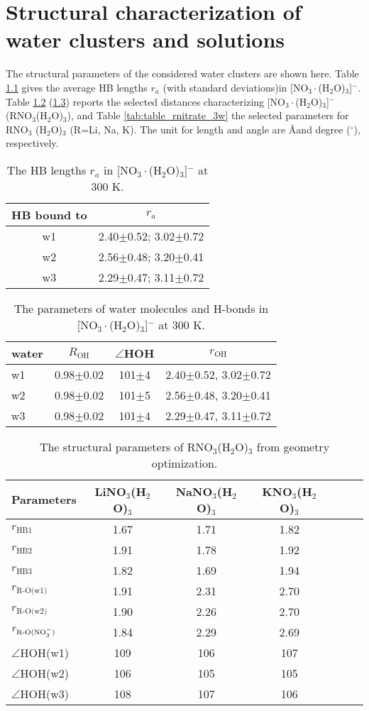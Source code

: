 \chapter{Structural characterization of water clusters and solutions}\label{structure_of_clusters}
The structural parameters of the considered water clusters are shown here.
Table \ref{tab:3_nitrate_bond} gives the average HB lengths $r_a$ (with standard deviations)in [NO$_3\cdot$(H$_2$O)$_3$]$^-$.  
Table \ref{tab:3w_nitrate} (\ref{tab:table_geo_opt}) reports the selected distances characterizing 
[NO$_3\cdot$(H$_2$O)$_3$]$^-$ (RNO$_3$(H$_2$O)$_3$), and Table \ref{tab:table_rnitrate_3w} the selected parameters for RNO$_3$   
 (H$_2$O)$_3$ (R=Li, Na, K).
The unit for length and angle are \AA and degree ($^\circ$), respectively.
% 
\begin{table}[!h]
\centering
\caption{\label{tab:3_nitrate_bond}%
The HB lengths $r_a$ in [NO$_3\cdot$(H$_2$O)$_3$]$^-$ at 300 K.} 
\begin{tabular}{cc} \\\toprule
 HB bound to & \multicolumn{1}{c}{ $r_a$} \\
\hline
 w1 &2.40$\pm$0.52; 3.02$\pm$0.72 \\
 w2 &2.56$\pm$0.48; 3.20$\pm$0.41 \\
 w3 &2.29$\pm$0.47; 3.11$\pm$0.72
\end{tabular}
\end{table}
%
\begin{table}[!htbp]
\centering
\caption{\label{tab:3w_nitrate}%
The parameters of water molecules and H-bonds in [NO$_3\cdot$(H$_2$O)$_3$]$^-$ at 300 K.}
\begin{tabular}{lccc}
water &$R_\text{OH}$ &$\angle$HOH & $r_\text{OH}$ \\
\hline
w1 &0.98$\pm$0.02 &101$\pm$4 & 2.40$\pm$0.52, 3.02$\pm$0.72 \\
w2 &0.98$\pm$0.02 &101$\pm$5 & 2.56$\pm$0.48, 3.20$\pm$0.41 \\
w3 &0.98$\pm$0.02 &101$\pm$4 & 2.29$\pm$0.47, 3.11$\pm$0.72
\end{tabular}
\end{table}
%
\begin{table}[!htbp]
\centering
\caption{\label{tab:table_geo_opt}%
  The structural parameters of RNO$_3$(H$_2$O)$_3$ from geometry optimization.} 
\begin{tabular}{l*{4}ccc}
Parameters  & LiNO$_3$(H$_2$O)$_3$& NaNO$_3$(H$_2$O)$_3$ & KNO$_3$(H$_2$O)$_3$\\
\hline
$r_\text{HB1}$& 1.67 & 1.71 & 1.82 \\
$r_\text{HB2}$& 1.91 & 1.78 & 1.92\\
$r_\text{HB3}$& 1.82 & 1.69 & 1.94\\
$r_\text{R-O(w1)}$ & 1.91 & 2.31 & 2.70\\
$r_\text{R-O(w2)}$ & 1.90 & 2.26 & 2.70\\
$r_\text{R-O(NO$_3^-$)}$ & 1.84 & 2.29 & 2.69 \\
$\angle$HOH(w1)& 109 & 106 &107 \\
$\angle$HOH(w2)& 106 & 105&105 \\
$\angle$HOH(w3)& 108 & 107 &106
\end{tabular}
\end{table}
